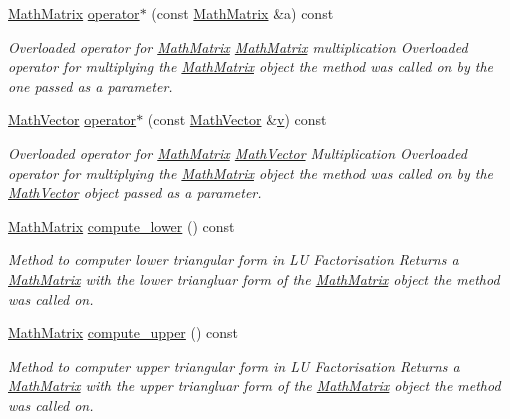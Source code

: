 \begin{DoxyCompactItemize}
\hyperlink{class_math_matrix}{Math\-Matrix} \hyperlink{class_math_matrix_a6bdb0416ce373dd534b83c2c26bb4480}{operator$\ast$} (const \hyperlink{class_math_matrix}{Math\-Matrix} \&a) const 
\begin{DoxyCompactList}\small\item\em Overloaded operator for \hyperlink{class_math_matrix}{Math\-Matrix} \hyperlink{class_math_matrix}{Math\-Matrix} multiplication Overloaded operator for multiplying the \hyperlink{class_math_matrix}{Math\-Matrix} object the method was called on by the one passed as a parameter. \end{DoxyCompactList}\item 
\hyperlink{class_math_vector}{Math\-Vector} \hyperlink{class_math_matrix_a718529b1f5441bbc7282212d6a2cdb5e}{operator$\ast$} (const \hyperlink{class_math_vector}{Math\-Vector} \&\hyperlink{class_matrix_a7b1d6b09f3f6fff47c03f63a51a93cd7}{v}) const 
\begin{DoxyCompactList}\small\item\em Overloaded operator for \hyperlink{class_math_matrix}{Math\-Matrix} \hyperlink{class_math_vector}{Math\-Vector} Multiplication Overloaded operator for multiplying the \hyperlink{class_math_matrix}{Math\-Matrix} object the method was called on by the \hyperlink{class_math_vector}{Math\-Vector} object passed as a parameter. \end{DoxyCompactList}\item 
\hyperlink{class_math_matrix}{Math\-Matrix} \hyperlink{class_math_matrix_a20fb58fbbdd549999e4d819f7747b1fb}{compute\-\_\-lower} () const 
\begin{DoxyCompactList}\small\item\em Method to computer lower triangular form in L\-U Factorisation Returns a \hyperlink{class_math_matrix}{Math\-Matrix} with the lower triangluar form of the \hyperlink{class_math_matrix}{Math\-Matrix} object the method was called on. \end{DoxyCompactList}\item 
\hyperlink{class_math_matrix}{Math\-Matrix} \hyperlink{class_math_matrix_ab1a5c4eb839e9abce390b10f9cd6bee6}{compute\-\_\-upper} () const 
\begin{DoxyCompactList}\small\item\em Method to computer upper triangular form in L\-U Factorisation Returns a \hyperlink{class_math_matrix}{Math\-Matrix} with the upper triangluar form of the \hyperlink{class_math_matrix}{Math\-Matrix} object the method was called on. \end{DoxyCompactList}\item 

\end{DoxyCompactItemize}
